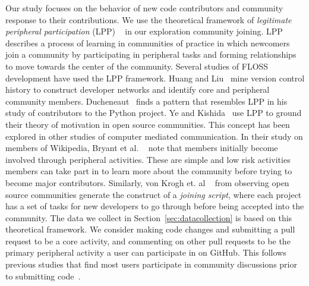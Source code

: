 \documentclass{iitthesis}
\begin{document}
 \label{sec:communities}
Our study focuses on the behavior of new code contributors and community
response to their contributions. We use the theoretical framework of
\textit{legitimate peripheral participation} (LPP) ~\cite{lave_situated_1991} in
our exploration community joining. LPP describes a process of learning in
communities of practice in which newcomers join a community by participating in
peripheral tasks and forming relationships to move towards the center of the
community. Several studies of FLOSS development have used the LPP framework.
Huang and Liu~\cite{huang_mining_2005} mine version control history to construct
developer networks and identify core and peripheral community members.
Ducheneaut~\cite{ducheneaut_socialization_2005} finds a pattern that resembles
LPP in his study of contributors to the Python project. Ye and
Kishida~\cite{ye_toward_2003} use LPP to ground their theory of motivation in
open source communities. This concept has been explored in other studies of
computer mediated communication.  In their study on members of Wikipedia,
Bryant et al. ~\cite{bryant_becoming_2005} note that members initially become
involved through peripheral activities. These are simple and low risk activities
members can take part in to learn more about the community before trying to
become major contributors. Similarly, von Krogh et. al
~\cite{von_krogh_community_2003} from observing open source communities generate
the construct of a \textit{joining script}, where each project has a set of
tasks for new developers to go through before being accepted into the community.
The data we collect in Section~\ref{sec:datacollection} is based on this
theoretical framework. We consider making code changes and submitting a pull
request to be a core activity, and commenting on other pull requests to be the
primary peripheral activity a user can participate in on GitHub. This follows
previous studies that find most users participate in community discussions prior
to submitting code~\cite{ducheneaut_socialization_2005,
von_krogh_community_2003}.

 \label{chap:methods}


 \label{sec:datacollection}
\end{document}
